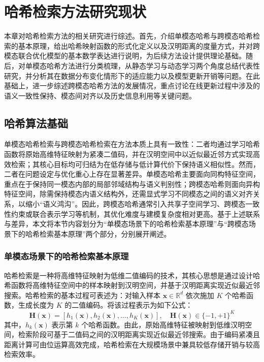 \setlength{\parskip}{0pt}
\chapter{哈希检索方法研究现状}
本章对哈希检索方法的相关研究进行综述。首先，介绍单模态哈希与跨模态哈希检索的基本原理，给出哈希映射函数的形式化定义以及汉明距离的度量方式，并对跨模态联合优化模型的基本数学表达进行说明，为后续方法设计提供理论基础。随后，对单模态哈希方法进行分类梳理，从静态学习与动态学习两个角度总结代表性研究，并分析其在数据分布变化情形下的适应能力以及模型更新开销等问题。在此基础上，进一步综述跨模态哈希方法的发展情况，重点讨论在线更新过程中涉及的语义一致性保持、模态间对齐以及历史信息利用等关键问题。
\section{哈希算法基础}

单模态哈希检索与跨模态哈希检索在方法本质上具有一致性：二者均通过学习哈希函数将原始高维特征映射为紧凑二值码，并在汉明空间中以近似最近邻方式实现高效检索；其核心目标均可归结为在低存储与低计算代价下保持语义相似性。然而，二者在问题设定与优化重心上存在显著差异。单模态哈希主要面向同构特征空间，重点在于保持同一模态内部的局部邻域结构与语义判别性；跨模态哈希则面向异构特征空间，除需保持模态内语义结构外，还需显式学习不同模态之间的语义对齐关系，以缩小“语义鸿沟”。因此，跨模态哈希通常引入共享子空间学习、跨模态一致性约束或联合表示学习等机制，其优化难度与建模复杂度相对更高。基于上述联系与差异，本文将本节内容划分为“单模态场景下的哈希检索基本原理”与“跨模态场景下的哈希检索基本原理”两个部分，分别展开阐述。

\subsection{单模态场景下的哈希检索基本原理}
哈希检索是一种将高维特征映射为低维二值编码的技术，其核心思想是通过设计哈希函数将高维特征空间中的样本映射到汉明空间，并基于汉明距离实现近似最近邻搜索。哈希检索的基本过程可表述为：对输入样本 $\mathbf{x}\in\mathbb{R}^{d}$ 依次施加 $K$ 个哈希函数，生成长度为 $K$ 的二值编码。将该过程表示为如下公式：
\begin{equation}
  \mathbf{H}(\mathbf{x})=[h_1(\mathbf{x}),h_2(\mathbf{x}),\dots,h_K(\mathbf{x})], \quad \mathbf{H}(\mathbf{x})\in\{-1,+1\}^{K}
\end{equation}
其中，$h_k(\mathbf{x})$ 表示第 $k$ 个哈希函数。由此，原始高维特征被映射到低维汉明空间，检索阶段可基于二值码之间的汉明距离实现近似最近邻搜索。由于编码紧凑且距离计算可由位运算高效完成，哈希检索在大规模场景中兼具较低存储开销与较高检索效率。

